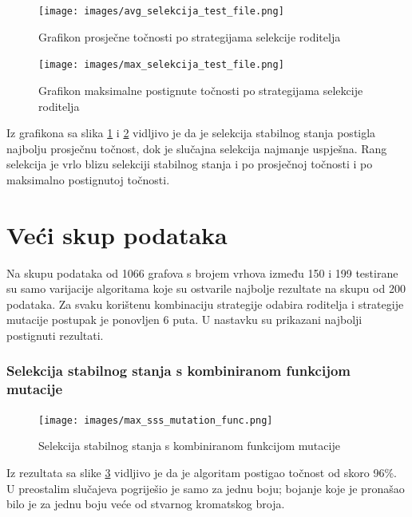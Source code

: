 \documentclass[times, utf8, zavrsni, numeric]{fer}
\begin{document}
\begin{figure}[h]
\centering
\texttt{[image: images/avg\_selekcija\_test\_file.png]}
\caption{Grafikon prosječne točnosti po strategijama selekcije roditelja}
\label{fig:grafikon prosjecne tocnosti po strategijama selekcije roditelja}
\end{figure}

\begin{figure}[h]
\centering
\texttt{[image: images/max\_selekcija\_test\_file.png]}
\caption{Grafikon maksimalne postignute točnosti po strategijama selekcije roditelja}
\label{fig:grafikon maksimalne tocnosti po strategijama selekcije roditelja}
\end{figure}

Iz grafikona sa slika \ref{fig:grafikon prosjecne tocnosti po strategijama selekcije roditelja} i \ref{fig:grafikon maksimalne tocnosti po strategijama selekcije roditelja} vidljivo je da je selekcija stabilnog stanja postigla najbolju prosječnu točnost, dok je slučajna selekcija najmanje uspješna. Rang selekcija je vrlo blizu selekciji stabilnog stanja i po prosječnoj točnosti i po maksimalno postignutoj točnosti. 

\newpage
\section{Veći skup podataka}
Na skupu podataka od 1066 grafova s brojem vrhova između 150 i 199 testirane su samo varijacije algoritama koje su ostvarile najbolje rezultate na skupu od 200 podataka. Za svaku korištenu kombinaciju strategije odabira roditelja i strategije mutacije postupak je ponovljen 6 puta. U nastavku su prikazani najbolji postignuti rezultati.

\subsubsection{Selekcija stabilnog stanja s kombiniranom funkcijom mutacije}

\begin{figure}[h]
\centering
\texttt{[image: images/max\_sss\_mutation\_func.png]}
\caption{Selekcija stabilnog stanja s kombiniranom funkcijom mutacije}
\label{fig:sss kombinirana rezultati}
\end{figure}

Iz rezultata sa slike \ref{fig:sss kombinirana rezultati} vidljivo je da je algoritam postigao točnost od skoro 96\%. U preostalim slučajeva pogriješio je samo za jednu boju; bojanje koje je pronašao bilo je za jednu boju veće od stvarnog kromatskog broja.
\end{document}
